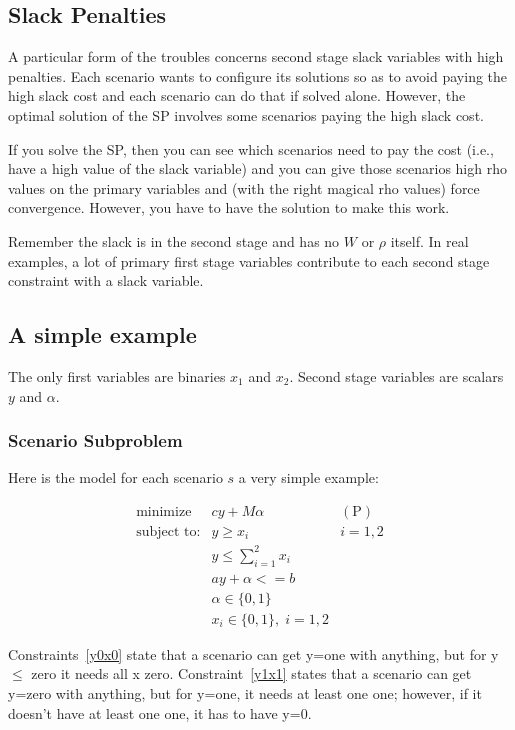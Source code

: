 \documentclass[12pt]{article}
\begin{document}
\subsection{Slack Penalties}

A particular form of the troubles concerns second stage slack
variables with high penalties. Each scenario wants to configure its
solutions so as to avoid paying the high slack cost and each scenario
can do that if solved alone. However, the optimal solution of the SP involves
some scenarios paying the high slack cost.

If you solve the SP, then you can see which scenarios need to pay the
cost (i.e., have a high value of the slack variable) and you can give
those scenarios high rho values on the primary variables and (with
the right magical rho values) force convergence. However, you
have to have the solution to make this work.

Remember the slack is in the second stage and has no $W$ or $\rho$
itself. In real examples, a lot of primary first stage variables
contribute to each second stage constraint with a slack variable.

\subsection{A simple example}

The only first variables are binaries $x_1$ and $x_2$. Second stage
variables are scalars $y$ and $\alpha$.

\subsubsection{Scenario Subproblem}
Here is the model for each scenario $s$ a very simple example:


\begin{eqnarray*}
\mbox{minimize} & cy + M\alpha & (\mbox{P}) \\
\mbox{subject to:} & y \geq x_i & i=1,2 \label{y0x0}\\
  & y \leq \sum_{i=1}^{2}x_i \label{y1x1} & \\
  & ay + \alpha <= b & \\
  & \alpha \in \{0,1\} &  \\
  & x_{i} \in \{0,1\},\; i=1,2 &
\end{eqnarray*}

Constraints~\ref{y0x0} state that a scenario can get y=one with anything, but
for y $\leq$ zero it needs all x zero. Constraint~\ref{y1x1} states
that a scenario can get y=zero with anything, but for y=one, it needs at least one one;
however, if it doesn't have at least one one, it has to have y=0.
\end{document}
